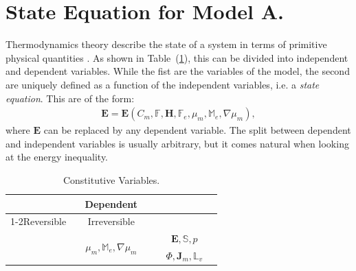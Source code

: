 \documentclass[runningheads]{llncs}
\newcommand{\F}{\ensuremath{\mathbb{F}}}
\newcommand{\LL}{\ensuremath{\mathbb{L}}}
\begin{document}
\section{State Equation for Model A.}
\label{stateequation}
Thermodynamics theory describe the state of a system in terms of primitive physical quantities \cite{GURTIN}. As shown in Table~(\ref{ind}), this can be divided into independent and dependent variables. While the fist are the variables of the model, the second are uniquely defined as a function of the independent variables, i.e. a \textit{state equation}. This are of the form: 
\begin{eqnarray}
\mathbf{E}=\mathbf{E}(C_m,\F,\mathbf{H},\F_e,\mu_m,\mathbb{M}_e,\nabla \mu_m),
\end{eqnarray}
where $\mathbf{E}$ can be replaced by any dependent variable. The split between dependent and independent variables is usually arbitrary, but it comes natural when looking at the energy inequality.
\vspace{3mm}
\begin{table}
	\centering
\begin{tabular}{|c|c|c|}
	\hline\addlinespace[2pt]
	\multicolumn{2}{|c|}{Independent} & \multirow{2}{*}{Dependent} \\
	\cline{1-2}\addlinespace[2pt]
	Reversible & Irreversible&\\[3pt]
	\hline\addlinespace[2pt]
\multirow{2}{*}{$\quad C_m,\ \F,\  \mathbf{H}, \F_e\quad$} & \multirow{2}{*}{$\quad\mu_m,\mathbb{M}_e,\nabla \mu_m\quad$} &	$\quad\mathbf{E}, \mathbb{S}, p\quad$ \\
&& $\quad\Phi, \mathbf{J}_m,\LL_v\quad$\\[2pt]
\hline
\end{tabular}
\vspace{3mm}
\caption{Constitutive Variables.}
\label{ind}
\end{table}
\end{document}
